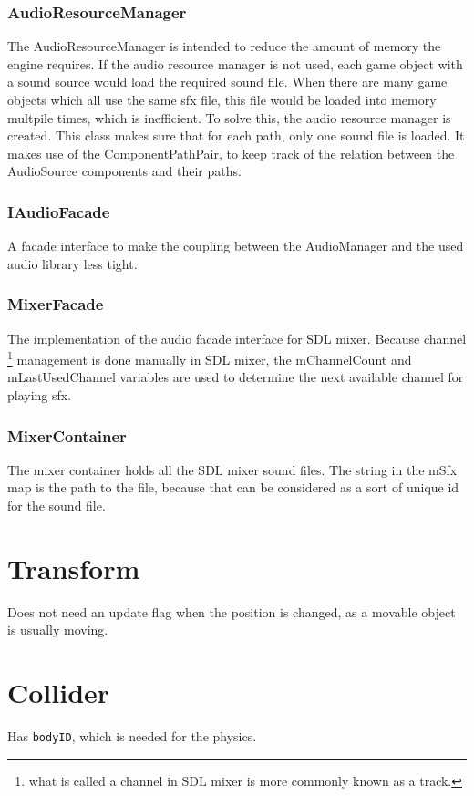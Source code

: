 \documentclass[draft]{article}
\begin{document}
\subsubsection{AudioResourceManager}
The AudioResourceManager is intended to reduce the amount of memory the engine requires.
If the audio resource manager is not used, each game object with a sound source would load the required sound file.
When there are many game objects which all use the same sfx file, this file would be loaded into memory multpile times, which is inefficient.
To solve this, the audio resource manager is created. This class makes sure that for each path, only one sound file is loaded.
It makes use of the ComponentPathPair, to keep track of the relation between the AudioSource components and their paths.

\subsubsection{IAudioFacade}
A facade interface to make the coupling between the AudioManager and the used audio library less tight.

\subsubsection{MixerFacade}
The implementation of the audio facade interface for SDL mixer.
Because channel \footnote{what is called a channel in SDL mixer is more commonly known as a track.} management is done
manually in SDL mixer, the mChannelCount and mLastUsedChannel variables are used to determine the next available channel for playing sfx.

\subsubsection{MixerContainer}
The mixer container holds all the 
SDL mixer sound files.
The string in the mSfx map is the path to the file, because that can be considered as a sort of unique id for the sound file.

\section{Transform}
Does not need an update flag when the position is changed, as a movable object is usually moving.

\section{Collider}
Has \texttt{bodyID}, which is needed for the physics.
\end{document}
